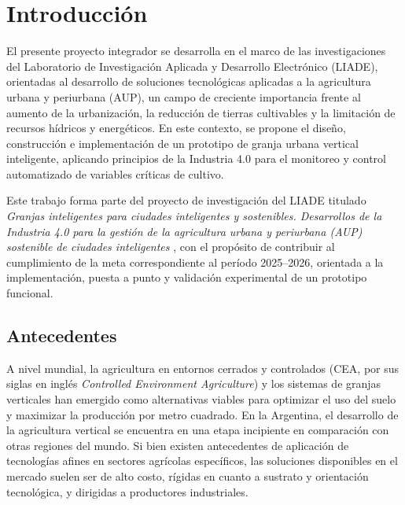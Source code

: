 \chapter{Introducción}
\label{cap:introduccion}

El presente proyecto integrador se desarrolla en el marco de las investigaciones del Laboratorio de Investigación Aplicada y Desarrollo Electrónico (LIADE), orientadas al desarrollo de soluciones tecnológicas aplicadas a la agricultura urbana y periurbana (AUP), un campo de creciente importancia frente al aumento de la urbanización, la reducción de tierras cultivables y la limitación de recursos hídricos y energéticos. En este contexto, se propone el diseño, construcción e implementación de un prototipo de granja urbana vertical inteligente, aplicando principios de la Industria 4.0 para el monitoreo y control automatizado de variables críticas de cultivo.

Este trabajo forma parte del proyecto de investigación del LIADE titulado \textit{Granjas inteligentes para ciudades inteligentes y sostenibles. Desarrollos de la Industria 4.0 para la gestión de la agricultura urbana y periurbana (AUP) sostenible de ciudades inteligentes} \cite{vanella2023}, con el propósito de contribuir al cumplimiento de la meta correspondiente al período 2025--2026, orientada a la implementación, puesta a punto y validación experimental de un prototipo funcional.

\section{Antecedentes}
\label{sec:antecedentes}

A nivel mundial, la agricultura en entornos cerrados y controlados (CEA, por sus siglas en inglés \textit{Controlled Environment Agriculture}) y los sistemas de granjas verticales han emergido como alternativas viables para optimizar el uso del suelo y maximizar la producción por metro cuadrado. En la Argentina, el desarrollo de la agricultura vertical se encuentra en una etapa incipiente en comparación con otras regiones del mundo. Si bien existen antecedentes de aplicación de tecnologías afines en sectores agrícolas específicos, las soluciones disponibles en el mercado suelen ser de alto costo, rígidas en cuanto a sustrato y orientación tecnológica, y dirigidas a productores industriales.

